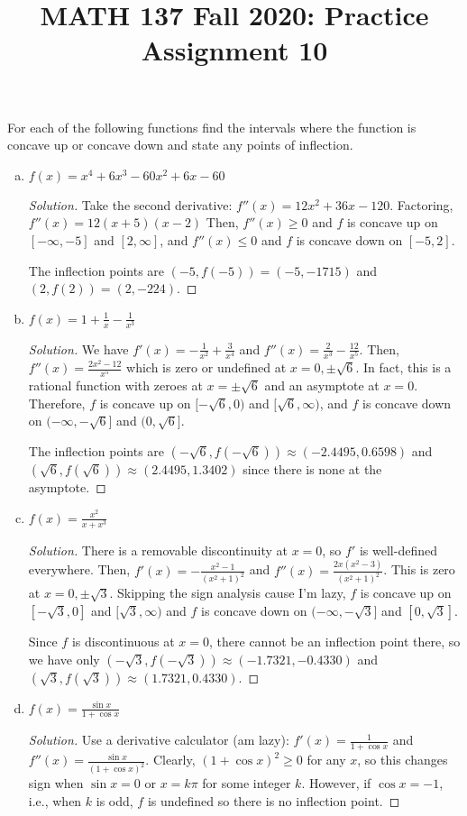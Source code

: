 \documentclass{agony}
\title{MATH 137 Fall 2020: Practice Assignment 10}
\begin{document}
\thispagestyle{firstpage}
\textbf{\thetitle}

\question For each of the following functions find the intervals where the function
is concave up or concave down and state any points of inflection.
\begin{enumerate}[(a)]
  \item $f(x) = x^4+6x^3-60x^2+6x-60$
        \begin{proof}[Solution]
          Take the second derivative: $f''(x) = 12x^2 + 36x - 120$.
          Factoring, $f''(x) = 12(x+5)(x-2)$
          Then, $f''(x) \geq 0$ and $f$ is concave up on $[-\infty,-5]$ and $[2,\infty]$,
          and $f''(x) \leq 0$ and $f$ is concave down on $[-5,2]$.

          The inflection points are $(-5,f(-5)) = (-5,-1715)$ and $(2,f(2)) = (2,-224)$.
        \end{proof}
  \item $f(x) = 1+\frac{1}{x}-\frac{1}{x^3}$
        \begin{proof}[Solution]
          We have $f'(x) = -\frac{1}{x^2} + \frac{3}{x^4}$ and $f''(x) = \frac{2}{x^3} - \frac{12}{x^5}$.
          Then, $f''(x) = \frac{2x^2-12}{x^5}$ which is zero or undefined at $x=0,\pm\sqrt6$.
          In fact, this is a rational function with zeroes at $x=\pm\sqrt6$ and an asymptote at $x=0$.
          Therefore, $f$ is concave up on $[-\sqrt6,0)$ and $[\sqrt6,\infty)$,
          and $f$ is concave down on $(-\infty,-\sqrt6]$ and $(0,\sqrt6]$.

          The inflection points are $(-\sqrt6,f(-\sqrt6)) \approx (-2.4495, 0.6598)$
          and $(\sqrt6,f(\sqrt6)) \approx (2.4495,1.3402)$ since there is none at the asymptote.
        \end{proof}
  \item $f(x) = \frac{x^2}{x+x^3}$
        \begin{proof}[Solution]
          There is a removable discontinuity at $x=0$, so $f'$ is well-defined everywhere.
          Then, $f'(x) = -\frac{x^2-1}{(x^2+1)^2}$ and $f''(x) = \frac{2x(x^2-3)}{(x^2+1)^2}$.
          This is zero at $x=0,\pm\sqrt3$.
          Skipping the sign analysis cause I'm lazy, $f$ is concave up on $[-\sqrt3,0]$ and $[\sqrt3,\infty)$
          and $f$ is concave down on $(-\infty,-\sqrt3]$ and $[0,\sqrt3]$.

          Since $f$ is discontinuous at $x=0$, there cannot be an inflection point there, so we have only
          $(-\sqrt3,f(-\sqrt3)) \approx (-1.7321, -0.4330)$ and $(\sqrt3,f(\sqrt3)) \approx (1.7321, 0.4330)$.
        \end{proof}
  \item $f(x) = \frac{\sin x}{1+\cos x}$
        \begin{proof}[Solution]
          Use a derivative calculator (am lazy):
          $f'(x) = \frac{1}{1+\cos x}$ and $f''(x) = \frac{\sin x}{(1+\cos x)^2}$.
          Clearly, $(1+\cos x)^2 \geq 0$ for any $x$,
          so this changes sign when $\sin x = 0$ or $x = k\pi$ for some integer $k$.
          However, if $\cos x = -1$, i.e., when $k$ is odd, $f$ is undefined so there is no inflection point.


\end{proof}
\end{enumerate}
\end{document}
